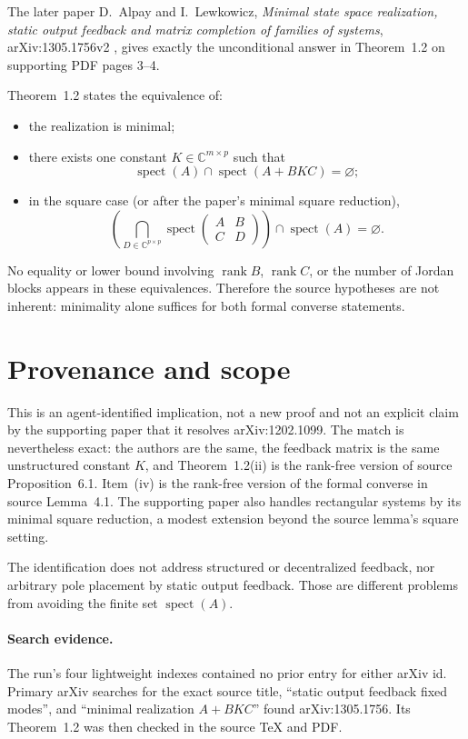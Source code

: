 \documentclass[11pt]{article}
\newcommand{\C}{\mathbb C}
\newcommand{\spec}{\operatorname{spect}}
\begin{document}
The later paper D.~Alpay and I.~Lewkowicz, \emph{Minimal state space
realization, static output feedback and matrix completion of families of
systems}, arXiv:1305.1756v2 \cite{support}, gives exactly the unconditional
answer in Theorem~1.2 on supporting PDF pages 3--4.

Theorem~1.2 states the equivalence of:
\begin{itemize}
\item[(i)] the realization is minimal;
\item[(ii)] there exists one constant $K\in\C^{m\times p}$ such that
\[
 \spec(A)\cap\spec(A+BKC)=\varnothing;
\]
\item[(iv)] in the square case (or after the paper's minimal square
reduction),
\[
 \left(\bigcap_{D\in\C^{p\times p}}
   \spec\begin{pmatrix}A&B\\ C&D\end{pmatrix}\right)
   \cap\spec(A)=\varnothing.
\]
\end{itemize}
No equality or lower bound involving $\operatorname{rank}B$,
$\operatorname{rank}C$, or the number of Jordan blocks appears in these
equivalences.  Therefore the source hypotheses are not inherent: minimality
alone suffices for both formal converse statements.

\section*{Provenance and scope}

This is an agent-identified implication, not a new proof and not an explicit
claim by the supporting paper that it resolves arXiv:1202.1099.  The match is
nevertheless exact: the authors are the same, the feedback matrix is the same
unstructured constant $K$, and Theorem~1.2(ii) is the rank-free version of
source Proposition~6.1.  Item~(iv) is the rank-free version of the formal
converse in source Lemma~4.1.  The supporting paper also handles rectangular
systems by its minimal square reduction, a modest extension beyond the source
lemma's square setting.

The identification does not address structured or decentralized feedback,
nor arbitrary pole placement by static output feedback.  Those are different
problems from avoiding the finite set $\spec(A)$.

\paragraph{Search evidence.}
The run's four lightweight indexes contained no prior entry for either arXiv
id.  Primary arXiv searches for the exact source title, ``static output
feedback fixed modes'', and ``minimal realization $A+BKC$'' found
arXiv:1305.1756.  Its Theorem~1.2 was then checked in the source TeX and PDF.
\end{document}
